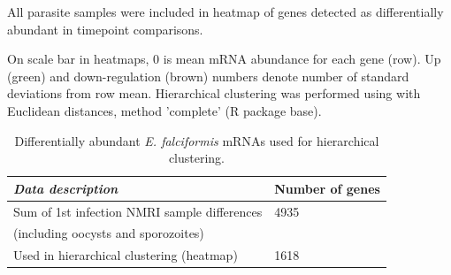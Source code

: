 \documentclass{bmcart}
\begin{document}
All parasite samples were included in heatmap of genes detected as differentially abundant in timepoint comparisons. 

On scale bar in heatmaps, 0 is mean mRNA abundance for each gene (row). Up (green) and down-regulation (brown) numbers denote number of standard deviations from row mean. Hierarchical clustering was performed using with Euclidean distances, method 'complete' (R package base).

\setlength{\tabcolsep}{10pt}
\begin{table}[H]
\small
\begin{center}
\caption{Differentially abundant \textit{E. falciformis} mRNAs used for hierarchical clustering.}
\begin{tabular}{*2l}    \toprule
	\textit{Data description} & Number of genes \\ \midrule
	Sum of 1st infection NMRI sample differences	& 4935  \\ 
	(including oocysts and sporozoites)	\\	
	Used in hierarchical clustering (heatmap)  	& 1618 \\ 	\bottomrule	
\hline
\end{tabular}
\end{center}
\end{table}



\end{document}
